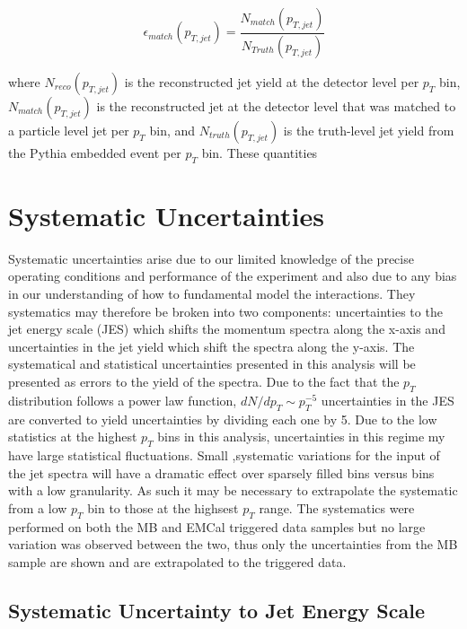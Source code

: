 \begin{equation}
 \epsilon_{match} (p_{T, jet}) = \frac{N_{match}(p_{T, jet}) }{N_{Truth}(p_{T, jet})}
\label{eq:jetmatchoeff}
\end{equation}

\noindent 
where $N_{reco} (p_{T, jet})$ is the reconstructed jet yield at the detector level per $p_{T}$ bin, $N_{match}(p_{T, jet})$ is the reconstructed jet at the detector level that was matched to a particle level jet per $p_{T}$ bin, and $N_{truth} (p_{T, jet})$ is the truth-level jet yield from the Pythia embedded event per $p_{T}$ bin.  These quantities 

\section{Systematic Uncertainties}

Systematic uncertainties arise due to our limited knowledge of the precise operating conditions and performance of the experiment and also due to any bias in our understanding of how to fundamental model the interactions.  They systematics may therefore be broken into two components: uncertainties to the jet energy scale (JES) which shifts the momentum spectra along the x-axis and uncertainties in the jet yield which shift the spectra along the y-axis.  The systematical and statistical uncertainties presented in this analysis will be presented as errors to the yield of the spectra.  Due to the fact that the $p_{T}$ distribution follows a power law function, $dN/dp_{T} \sim p_{T}^{-5}$ uncertainties in the JES are converted to yield uncertainties by dividing each one by 5.
Due to the low statistics at the highest $p_{T}$ bins in this analysis, uncertainties in this regime my have large statistical fluctuations.  Small ,systematic variations for the input of the jet spectra will have a dramatic effect over sparsely filled bins versus bins with a low granularity.  As such it may be necessary to extrapolate the systematic from a low $p_{T}$ bin to those at the highsest $p_{T}$ range.  The systematics were performed on both the MB and EMCal triggered data samples but no large variation was observed between the two, thus only the uncertainties from the MB sample are shown and are extrapolated to the triggered data.


\subsection{Systematic Uncertainty to Jet Energy Scale}

